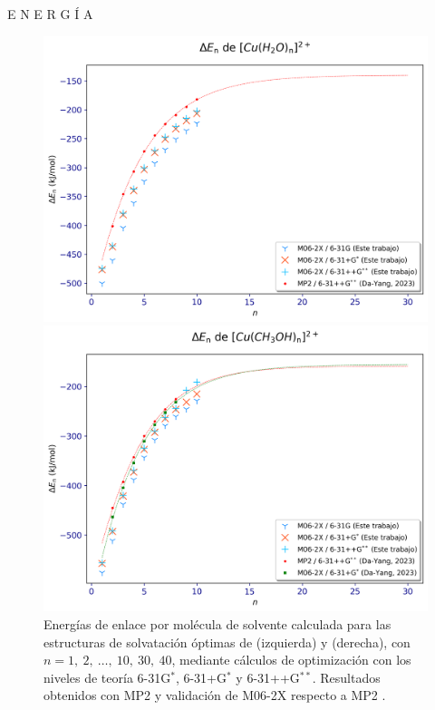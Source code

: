\documentclass[final]{beamer}
\newlength{\colwidth}
\begin{document}
\begin{frame}[t]
\begin{columns}[t]
\begin{column}{\colwidth}
\begin{block}{E N E R G Í A}{}
				\begin{figure}[H]
					\centering
					\begin{minipage}[b]{0.48\textwidth}
						\centering
						\includegraphics[width=\textwidth]{logos/bases_agua.png}
					\end{minipage}%
					\hfill
					\begin{minipage}[b]{0.48\textwidth}
						\centering
						\includegraphics[width=\textwidth]{logos/bases_metanol.png}
					\end{minipage}

					\caption{Energías de enlace por molécula de solvente calculada para las estructuras de solvatación óptimas de  (izquierda) y  (derecha), con $n = 1,\ 2,\ \ldots,\ 10,\ 30,\ 40$, mediante cálculos de optimización con los niveles de teoría 6-31G$^\ast$, 6-31+G$^\ast$ y 6-31++G$^{\ast\ast}$. Resultados obtenidos con MP2 \cite{Me-2022-01} y validación de M06-2X respecto a MP2 \cite{Me-2023-01}.}
					\label{fig:bases}
				\end{figure}
				

\end{block}
\end{column}
\end{columns}
\end{frame}
\end{document}
